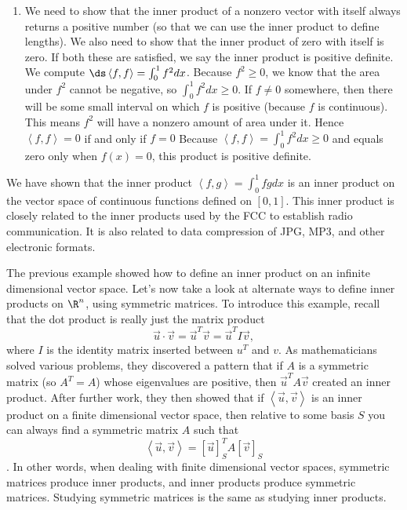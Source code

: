 \begin{example}
\begin{enumerate}
 	\item We need to show that the inner product of a nonzero vector with itself always returns a positive number (so that we can use the inner product to define lengths).  We also need to show that the inner product of zero with itself is zero. If both these are satisfied, we say the inner product is positive definite. 
 	We compute $\ds \left<f,f\right> = \int_0^1 f^2 dx$.  Because $f^2 \geq 0$, we know that the area under $f^2$ cannot be negative, so $\int_0^1 f^2dx \geq 0$. If $f\neq 0$ somewhere, then there will be some small interval on which $f$ is positive (because $f$ is continuous). This means $f^2$ will have a nonzero amount of area under it.  Hence $\left<f,f\right> =0$ if and only if $f=0$ 
Because $\left<f,f\right> = \int_0^1 f^2 dx \geq 0$ and equals zero only when $f(x)=0$, this product is positive definite.
\end{enumerate}
We have shown that the inner product $\left<f,g\right> = \int_0^1 fg dx $ is an inner product on the vector space of continuous functions defined on $[0,1]$.  This inner product is closely related to the inner products used by the FCC to establish radio communication.  It is also related to data compression of JPG, MP3, and other electronic formats. 
\end{example}



The previous example showed how to define an inner product on an infinite dimensional vector space.  
Let's now take a look at alternate ways to define inner products on $\R^n$, using symmetric matrices. 
To introduce this example, recall that the dot product is really just the matrix product 
$$\vec u\cdot \vec v = \vec u^T\vec v = \vec u^T I \vec v,$$
where $I$ is the identity matrix inserted between $u^T$ and $v$.
As mathematicians solved various problems, they discovered a pattern that if $A$ is a symmetric matrix (so $A^T=A$) whose eigenvalues are positive, then $\vec u^T A \vec v$ created an inner product. After further work, they then showed that if $\left<\vec u,\vec v\right>$ is an inner product on a finite dimensional vector space, then relative to some basis $S$ you can always find a symmetric matrix $A$ such that 
$$\left<\vec u,\vec v\right> = [\vec u]_S^T A [\vec v]_S$$.  In other words, when dealing with finite dimensional vector spaces, symmetric matrices produce inner products, and inner products produce symmetric matrices. Studying symmetric matrices is the same as studying inner products.

